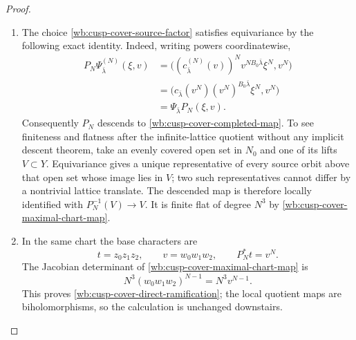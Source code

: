 \begin{proof}
\begin{enumerate}[label=\arabic*.,leftmargin=*]
\item The choice \eqref{wb:cusp-cover-source-factor} satisfies equivariance by the following exact identity.
Indeed, writing powers coordinatewise,
\begin{align}
 P_N\Psi^{(N)}_{\bar\lambda}(\xi,v)
 &=\bigl((c^{(N)}_{\bar\lambda}(v))^N
          v^{NB_0\bar\lambda}\xi^N,v^N\bigr)\\
 &=\bigl(c_{\bar\lambda}(v^N)
          (v^N)^{B_0\bar\lambda}\xi^N,v^N\bigr)\\
 &=\Psi_{\bar\lambda}P_N(\xi,v).
 \label{wb:cusp-cover-equivariance-computation}
\end{align}
Consequently $P_N$ descends to \eqref{wb:cusp-cover-completed-map}.  To see
finiteness and flatness after the infinite-lattice quotient without any
implicit descent theorem, take an evenly covered open set in $N_0$ and
one of its lifts $V\subset Y$.  Equivariance gives a unique representative
of every source orbit above that open set whose image lies in $V$; two
such representatives cannot differ by a nontrivial lattice translate.
The descended map is therefore locally identified with
$P_N^{-1}(V)\to V$.  It is finite flat of degree $N^3$ by
\eqref{wb:cusp-cover-maximal-chart-map}.

\item In the same chart the base characters are
\[
 t=z_0z_1z_2,\qquad v=w_0w_1w_2,\qquad P_N^*t=v^N.
\]
The Jacobian determinant of \eqref{wb:cusp-cover-maximal-chart-map} is
\[
 N^3(w_0w_1w_2)^{N-1}=N^3v^{N-1}.
\]
This proves \eqref{wb:cusp-cover-direct-ramification}; the local quotient
maps are biholomorphisms, so the calculation is unchanged downstairs.


\end{enumerate}
\end{proof}
